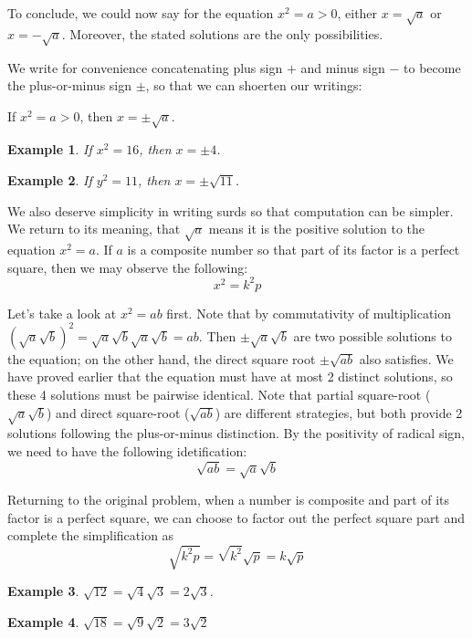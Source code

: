 \documentclass[12pt]{article}
\newtheorem*{example}{Example}
\begin{document}
    To conclude, we could now say for the equation $x^2=a>0$, either $x=\sqrt{a}$ or $x=-\sqrt{a}$. Moreover, the stated solutions are the only possibilities.

    We write for convenience concatenating plus sign $+$ and minus sign $-$ to become the plus-or-minus sign $\pm$, so that we can shoerten our writings:

    If $x^2=a>0$, then $x=\pm \sqrt{a}$.
    
    \begin{example}
        If $x^2=16$, then $x=\pm 4$.
    \end{example}

    \begin{example}
        If $y^2=11$, then $x=\pm \sqrt{11}$.
    \end{example}

    We also deserve simplicity in writing surds so that computation can be simpler. We return to its meaning, that $\sqrt{a}$ means it is the positive solution to the equation $x^2=a$. If $a$ is a composite number so that part of its factor is a perfect square, then we may observe the following: $$x^2=k^2 p$$

    Let's take a look at $x^2=ab$ first. Note that by commutativity of multiplication $(\sqrt{a}\sqrt{b})^2=\sqrt{a}\sqrt{b}\sqrt{a}\sqrt{b}=ab$. Then $\pm\sqrt{a}\sqrt{b}$ are two possible solutions to the equation; on the other hand, the direct square root $\pm\sqrt{ab}$ also satisfies. We have proved earlier that the equation must have at most 2 distinct solutions, so these 4 solutions must be pairwise identical. Note that partial square-root ($\sqrt{a}\sqrt{b}$) and direct square-root ($\sqrt{ab}$) are different strategies, but both provide 2 solutions following the plus-or-minus distinction. By the positivity of radical sign, we need to have the following idetification: \[\sqrt{ab}=\sqrt{a}\sqrt{b}\]

    Returning to the original problem, when a number is composite and part of its factor is a perfect square, we can choose to factor out the perfect square part and complete the simplification as \[\sqrt{k^2 p}=\sqrt{k^2}\sqrt{p}=k\sqrt{p}\]

    \begin{example}
        $\sqrt{12}=\sqrt{4}\sqrt{3}=2\sqrt{3}$.
    \end{example}

    \begin{example}
        $\sqrt{18}=\sqrt{9}\sqrt{2}=3\sqrt{2}$
    \end{example}
\end{document}
